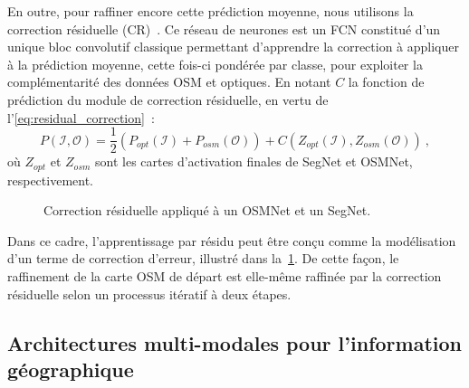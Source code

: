 En outre, pour raffiner encore cette prédiction moyenne, nous utilisons la correction résiduelle (CR)~\cite{audebert_semantic_2016}. Ce réseau de neurones est un \gls{FCN} constitué d'un unique bloc convolutif classique permettant d'apprendre la correction à appliquer à la prédiction moyenne, cette fois-ci pondérée par classe, pour exploiter la complémentarité des données \gls{OSM} et optiques. En notant $C$ la fonction de prédiction du module de correction résiduelle, en vertu de l'\cref{eq:residual_correction}~:
\begin{equation}
P(\mathcal{I}, \mathcal{O}) = \frac{1}{2} (P_{opt}(\mathcal{I}) + P_{osm}(\mathcal{O})) + C(Z_{opt}(\mathcal{I}), Z_{osm}(\mathcal{O}))~,
\end{equation}
où $Z_{opt}$ et $Z_{osm}$ sont les cartes d'activation finales de SegNet et OSMNet, respectivement.

\begin{figure}[h]
  \resizebox{\textwidth}{!}{}
  \caption{Correction résiduelle appliqué à un OSMNet et un SegNet.}
  \label{fig:refinet}
\end{figure}

Dans ce cadre, l'apprentissage par résidu peut être conçu comme la modélisation d'un terme de correction d'erreur, illustré dans la~\cref{fig:refinet}. De cette façon, le raffinement de la carte \gls{OSM} de départ est elle-même raffinée par la correction résiduelle selon un processus itératif à deux étapes.

\subsection{Architectures multi-modales pour l'information géographique}

